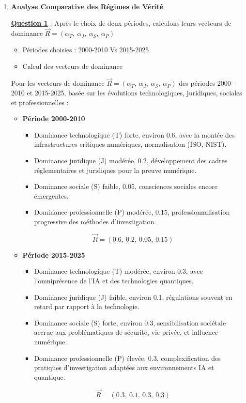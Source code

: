 \documentclass[12pt, a4paper]{article}
\newcommand{\question}[1]{\textbf{\underline{Question #1}}}
\begin{document}
	\begin{enumerate}[label=\textbf{\arabic*.}]
		\item \textbf{Analyse Comparative des Régimes de Vérité}
		
		\question{1} : Après le choix de deux périodes, calculons leurs vecteurs de dominance $\overrightarrow{R} = (\alpha_{T},\ \alpha_{J},\ \alpha_{S},\ \alpha_{P})$
		
		\begin{itemize}
			\item Périodes choisies : 2000-2010 Vs 2015-2025

			\item Calcul des vecteurs de dominance
		\end{itemize}
		
		Pour les vecteurs de dominance $\overrightarrow{R} = (\alpha_{T},\ \alpha_{J},\ \alpha_{S},\ \alpha_{P})$ des périodes 2000-2010 et 2015-2025, basée sur les évolutions technologiques, juridiques, sociales et professionnelles :
		
		\begin{itemize}
			\item \textbf{Période 2000-2010}
			\begin{itemize}
				\item Dominance technologique (T) forte, environ 0.6, avec la montée des infrastructures critiques numériques, normalisation (ISO, NIST).
				\item Dominance juridique (J) modérée, 0.2, développement des cadres réglementaires et juridiques pour la preuve numérique.
				\item Dominance sociale (S) faible, 0.05, consciences sociales encore émergentes.
				\item Dominance professionnelle (P) modérée, 0.15, professionnalisation progressive des méthodes d'investigation.
			\end{itemize}
			$$\overrightarrow{R} = (0.6,\ 0.2,\ 0.05,\ 0.15)$$
			
			\item \textbf{Période 2015-2025}
			\begin{itemize}
				\item Dominance technologique (T) modérée, environ 0.3, avec l'omniprésence de l'IA et des technologies quantiques.
				\item Dominance juridique (J) faible, environ 0.1, régulations souvent en retard par rapport à la technologie.
				\item Dominance sociale (S) forte, environ 0.3, sensibilisation sociétale accrue aux problématiques de sécurité, vie privée, et influence numérique.
				\item Dominance professionnelle (P) élevée, 0.3, complexification des pratiques d'investigation adaptées aux environnements IA et quantique.
			\end{itemize}
			$$\overrightarrow{R} = (0.3,\ 0.1,\ 0.3,\ 0.3)$$
		\end{itemize}
		

\end{enumerate}
\end{document}
